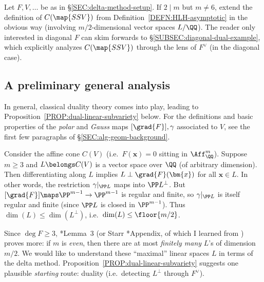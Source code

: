 \documentclass[12pt]{report}
\begin{document}
Let $F,V,\dots$ be as in \S\ref{SEC:delta-method-setup}.
If $2\mid m$ but $m\neq 6$,
extend the definition of $C(\map{SSV})$ from Definition~\ref{DEFN:HLH-asymptotic} in the obvious way (involving $m/2$-dimensional vector spaces $L/\QQ$).
The reader only interested in diagonal $F$ can skim forwards to \S\ref{SUBSEC:diagonal-dual-example}, which explicitly analyzes $C(\map{SSV})$ through the lens of $F^\vee$ (in the diagonal case).

\subsection{A preliminary general analysis}

In general,
classical duality theory comes into play,
leading to Proposition~\ref{PROP:dual-linear-subvariety} below.
For the definitions and basic properties of the \emph{polar} and \emph{Gauss} maps $[\grad{F}],\gamma$ associated to $V$,
see the first few paragraphs of \S\ref{SEC:alg-geom-background}.

Consider the affine cone $C(V)$ (i.e.~$F(\bm{x})=0$ sitting in $\Aff^m_\QQ$).
Suppose $m\geq3$ and
$L\belongs C(V)$ is a vector space over $\QQ$
(of arbitrary dimension).
Then differentiating along $L$ implies $L\perp\grad{F}(\bm{x})$
for all $\bm{x}\in L$.
In other words,
the restriction $\gamma\vert_{\PP L}$ maps into $\PP L^\perp$.
But $[\grad{F}]\maps\PP^{m-1}\to\PP^{m-1}$ is regular and finite,
so $\gamma\vert_{\PP L}$
is itself regular and finite (since $\PP L$ is closed in $\PP^{m-1}$).
Thus $\dim(L)\leq\dim(L^\perp)$,
i.e.~$\dim(L)\leq \floor{m/2}$.


Since $\deg{F}\geq 3$,
\cite{debarre2003lines}*{Lemma~3}
(or Starr \cite{starr2005fact_in_browning2006density}*{Appendix}, of which I learned from \cite{DaoMO15111linear_spaces})
proves more:
if $m$ is \emph{even},
then there are at most \emph{finitely many} $L$'s
of dimension $m/2$.
We would like to understand these ``maximal'' linear spaces $L$ in terms of the delta method.
Proposition~\ref{PROP:dual-linear-subvariety} suggests one plausible \emph{starting} route:
duality (i.e.~detecting $L^\perp$ through $F^\vee$).
\end{document}
